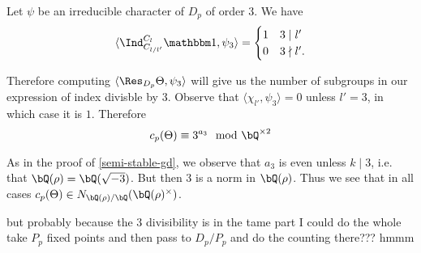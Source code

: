 Let $\psi$ be an irreducible character of $D_p$ of order $3$. We have 
\[ \langle \Ind_{C_{l / l'}}^{C_l} \trivial , \psi_3 \rangle = \begin{cases} 1 & 3 \mid l' \\ 0 & 3 \nmid l'. \end{cases}\] 

Therefore computing $\langle \Res_{D_p} \Theta, \psi_3 \rangle$ will give us the number of subgroups in our expression of index divisble by $3$. Observe that $\langle \chi_{l'}, \psi_3 \rangle = 0$ unless $l' = 3$, in which case it is $1$. Therefore 
\[ c_p(\Theta)  \equiv 3^{a_3} \mod \bQ^{\times 2} \]

As in the proof of \ref{semi-stable-gd}, we observe that $a_3$ is even unless $k \mid 3$,  i.e. that $\bQ(\rho) = \bQ(\sqrt{-3})$. But then $3$ is a norm in $\bQ(\rho)$. Thus we see that in all cases $c_p(\Theta) \in N_{\bQ(\rho) / \bQ}(\bQ(\rho)^{\times})$. 

{\color{red} but probably because the 3 divisibility is in the tame part I could do the whole take $P_p$ fixed points and then pass to $D_p / P_p$ and do the counting there??? hmmm }


    
    
